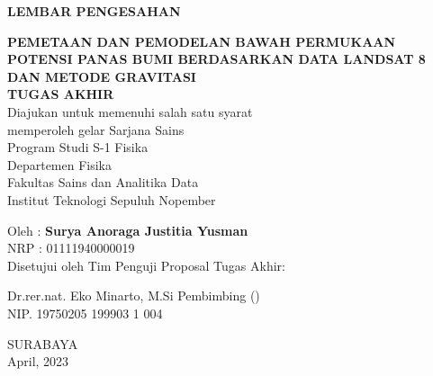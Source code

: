 \newpage
\begin{center}
	\textbf{LEMBAR PENGESAHAN}\\
	\vskip30pt
	
	\textbf{PEMETAAN DAN PEMODELAN BAWAH PERMUKAAN POTENSI PANAS BUMI BERDASARKAN DATA LANDSAT 8 DAN METODE GRAVITASI}\\
	
	\vskip30pt
	\textbf{TUGAS AKHIR}\\
	\doublespacing
	Diajukan untuk memenuhi salah satu syarat\\
	memperoleh gelar Sarjana Sains\\
	Program Studi S-1 Fisika\\
	Departemen Fisika\\
	Fakultas Sains dan Analitika Data\\
	Institut Teknologi Sepuluh Nopember\\
	\vskip 20pt
	
	Oleh : \textbf{Surya Anoraga Justitia Yusman}\\
	NRP : 01111940000019\\
	
	\vskip 50pt
	Disetujui oleh Tim Penguji Proposal Tugas Akhir:
\end{center}
		\vskip 35pt
		Dr.rer.nat. Eko Minarto, M.Si \hfill Pembimbing \hfill (\dotfill)\\
		NIP. 19750205 199903 1 004
\begin{center}
	\vfill
	SURABAYA\\
	April, 2023
\end{center}
\restoregeometry